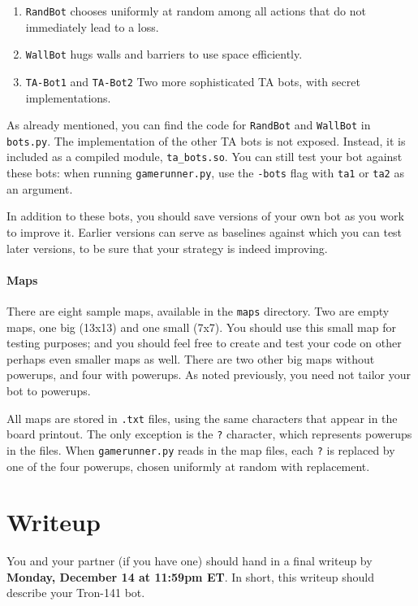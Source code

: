 \documentclass{article}
\newcommand{\amy}[1]{{\color{blue}[Amy: #1]}}
\begin{document}
\begin{enumerate}
\item \texttt{RandBot} chooses uniformly at random among all actions that do not immediately lead to a loss.

\item \texttt{WallBot} hugs walls and barriers to use space efficiently.

\item \texttt{TA-Bot1} and \texttt{TA-Bot2} Two more sophisticated TA bots, with secret implementations.
\end{enumerate}

As already mentioned, you can find the code for \texttt{RandBot} and
\texttt{WallBot} in \verb|bots.py|.  The implementation of the other
TA bots is not exposed.  Instead, it is included as a compiled module,
\verb|ta_bots.so|.  You can still test your bot against these bots:
when running \texttt{gamerunner.py}, use the \texttt{-bots} flag with
\texttt{ta1} or \texttt{ta2} as an argument.

In addition to these bots, you should save versions of your own bot as
you work to improve it.  Earlier versions can serve as baselines
against which you can test later versions, to be sure that your
strategy is indeed improving.



\paragraph{Maps}
There are eight sample maps, available in the \texttt{maps} directory.
Two are empty maps, one big (13x13) and one small (7x7).  You should
use this small map for testing purposes; and you should feel free to
create and test your code on other perhaps even smaller maps as well.
There are two other big maps without powerups, and four with powerups.
As noted previously, you need not tailor your bot to powerups.

All maps are stored in \texttt{.txt} files, using the same characters
that appear in the board printout.  The only exception is the
\texttt{?} character, which represents powerups in the files.  When
\texttt{gamerunner.py} reads in the map files, each \texttt{?} is
replaced by one of the four powerups, chosen uniformly at random
with replacement.


\section{Writeup}
You and your partner (if you have one) should hand in a final writeup
by \textbf{Monday, December 14 at 11:59pm ET}.  In short, this writeup
should describe your Tron-141 bot.
\end{document}
